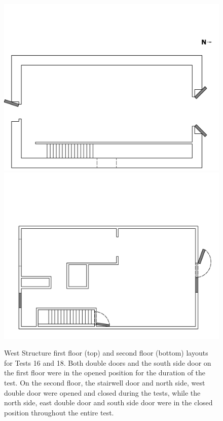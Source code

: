 \documentclass[12pt,oneside]{book}
\begin{document}
\begin{figure}[!ht]
\includegraphics[trim=0cm 0cm 0.75cm 4.5cm, clip=true, width=6in]{../Drawings/Specific_Tests/West_Structure_Hose_Test_18_1st_Floor}
\\
\includegraphics[trim=0cm 0cm 0.75cm 5cm, clip=true, width=6in]{../Drawings/Specific_Tests/West_Structure_Hose_Test_18_2nd_Floor}
\caption[West Structure first and second floor layouts for Tests 16 and 18]{West Structure first floor (top) and second floor (bottom) layouts for Tests 16 and 18. Both double doors and the south side door on the first floor were in the opened position for the duration of the test. On the second floor, the stairwell door and north side, west double door were opened and closed during the tests, while the north side, east double door and south side door were in the closed position throughout the entire test.}
\label{fig:flow_path_1}
\end{figure}
\FloatBarrier
\end{document}
